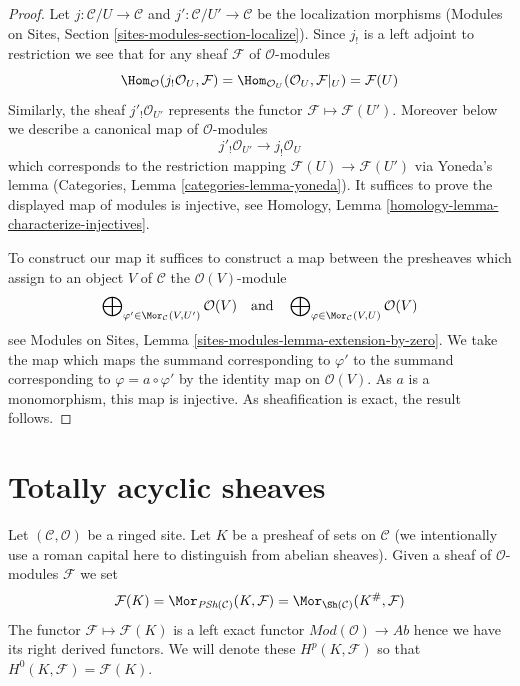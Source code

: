 \begin{proof}
Let $j : \mathcal{C}/U \to \mathcal{C}$ and
$j' : \mathcal{C}/U' \to \mathcal{C}$ be the localization morphisms
(Modules on Sites, Section \ref{sites-modules-section-localize}).
Since $j_!$ is a left adjoint to restriction we see that
for any sheaf $\mathcal{F}$ of $\mathcal{O}$-modules
$$
\Hom_\mathcal{O}(j_!\mathcal{O}_U, \mathcal{F})
=
\Hom_{\mathcal{O}_U}(\mathcal{O}_U, \mathcal{F}|_U)
=
\mathcal{F}(U)
$$
Similarly, the sheaf $j'_!\mathcal{O}_{U'}$ represents the
functor $\mathcal{F} \mapsto \mathcal{F}(U')$.
Moreover below we describe a canonical map of $\mathcal{O}$-modules
$$
j'_!\mathcal{O}_{U'} \longrightarrow j_!\mathcal{O}_U
$$
which corresponds to the restriction mapping
$\mathcal{F}(U) \to \mathcal{F}(U')$ via Yoneda's lemma
(Categories, Lemma \ref{categories-lemma-yoneda}).
It suffices to prove the displayed map of modules is injective, see
Homology, Lemma \ref{homology-lemma-characterize-injectives}.

\medskip\noindent
To construct our map it suffices to construct a map between the
presheaves which assign to an object $V$ of $\mathcal{C}$ the
$\mathcal{O}(V)$-module
$$
\bigoplus\nolimits_{\varphi' \in \Mor_\mathcal{C}(V, U')} \mathcal{O}(V)
\quad\text{and}\quad
\bigoplus\nolimits_{\varphi \in \Mor_\mathcal{C}(V, U)} \mathcal{O}(V)
$$
see Modules on Sites, Lemma \ref{sites-modules-lemma-extension-by-zero}.
We take the map which maps the summand corresponding to $\varphi'$
to the summand corresponding to $\varphi = a \circ \varphi'$
by the identity map on $\mathcal{O}(V)$. As $a$ is a monomorphism,
this map is injective. As sheafification is exact, the result
follows.
\end{proof}

\section{Totally acyclic sheaves}
\label{sites-cohomology-section-limp}
Let $(\mathcal{C}, \mathcal{O})$ be a ringed site.
Let $K$ be a presheaf of sets on $\mathcal{C}$ (we intentionally use a
roman capital here to distinguish from abelian sheaves).
Given a sheaf of $\mathcal{O}$-modules $\mathcal{F}$ we set
$$
\mathcal{F}(K) =
\Mor_{\textit{PSh}(\mathcal{C})}(K, \mathcal{F}) =
\Mor_{\Sh(\mathcal{C})}(K^\#, \mathcal{F})
$$
The functor $\mathcal{F} \mapsto \mathcal{F}(K)$ is a left exact functor
$\textit{Mod}(\mathcal{O}) \to \textit{Ab}$ hence we have its
right derived functors. We will denote these $H^p(K, \mathcal{F})$
so that $H^0(K, \mathcal{F}) = \mathcal{F}(K)$.

